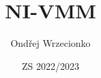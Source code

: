 \documentclass{article}
\title{NI-VMM}
\author{Ondřej Wrzecionko}
\date{ZS 2022/2023}
\begin{document}
\maketitle

\renewcommand{\contentsname}{Obsah}
\tableofcontents












\end{document}
